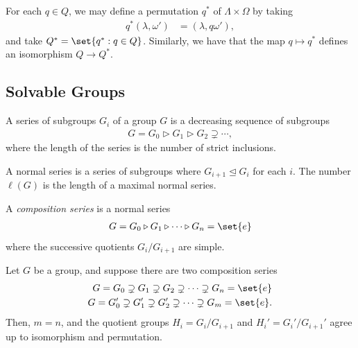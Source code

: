 \documentclass[10pt]{mypackage}
\begin{document}
For each $q\in Q$, we may define a permutation $q^{\ast}$ of $\Lambda\times\Omega$ by taking
\begin{align*}
  q^{\ast}\left( \lambda,\omega' \right) &= \left( \lambda,q\omega' \right),
\end{align*}
and take $Q^{\ast}=\set{q^{\ast} : q\in Q}$. Similarly, we have that the map $q\mapsto q^{\ast}$ defines an isomorphism $Q\rightarrow Q^{\ast}$.
\subsection{Solvable Groups}%
\begin{definition}
  A series of subgroups $G_i$ of a group $G$ is a decreasing sequence of subgroups
  \begin{align*}
    G = G_0\triangleright G_1\triangleright G_2\supsetneq\cdots,
  \end{align*}
  where the length of the series is the number of strict inclusions.

  A normal series is a series of subgroups where $G_{i+1}\trianglelefteq G_i$ for each $i$. The number $\ell(G)$ is the length of a maximal normal series.

  A \textit{composition series} is a normal series
  \begin{align*}
    G = G_0\triangleright G_1\triangleright\cdots\triangleright G_n = \set{e}
  \end{align*}
  where the successive quotients $G_i/G_{i+1}$ are simple.
\end{definition}
\begin{theorem}
  Let $G$ be a group, and suppose there are two composition series
  \begin{align*}
    G = G_0\supsetneq G_1\supsetneq G_2\supsetneq\cdots\supsetneq G_n = \set{e}\\
    G = G_0'\supsetneq G_1'\supsetneq G_2'\supsetneq\cdots\supsetneq G_m = \set{e}.
  \end{align*}
  Then, $m = n$, and the quotient groups $H_i = G_i/G_{i+1}$ and $H_i' = G_i'/G_{i+1}'$ agree up to isomorphism and permutation.
\end{theorem}
\end{document}
